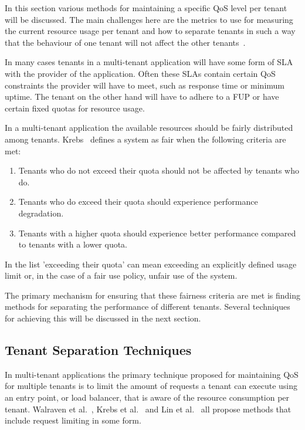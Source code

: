 In this section various methods for maintaining a specific \acf{QoS} level per tenant will be discussed.
The main challenges here are the metrics to use for measuring the current resource usage per tenant and how to separate tenants in such a way that the behaviour of one tenant will not affect the other tenants~\cite{krebs2013metrics}.

In many cases tenants in a multi-tenant application will have some form of \ac{SLA} with the provider of the application.
Often these SLAs contain certain \ac{QoS} constraints the provider will have to meet, such as response time or minimum uptime. 
The tenant on the other hand will have to adhere to a \ac{FUP} or have certain fixed quotas for resource usage.

In a multi-tenant application the available resources should be fairly distributed among tenants.
Krebs~\cite{krebs2013metrics} defines a system as fair when the following criteria are met:
\begin{enumerate}
	\item Tenants who do not exceed their quota should not be affected by tenants who do.
	\item Tenants who do exceed their quota should experience performance degradation. 
	\item Tenants with a higher quota should experience better performance compared to tenants with a lower quota.
\end{enumerate}
In the list 'exceeding their quota' can mean exceeding an explicitly defined usage limit or, in the case of a fair use policy, unfair use of the system.

The primary mechanism for ensuring that these fairness criteria are met is finding methods for separating the performance of different tenants.
Several techniques for achieving this will be discussed in the next section.

\subsection{Tenant Separation Techniques}
In multi-tenant applications the primary technique proposed for maintaining \ac{QoS} for multiple tenants is to limit the amount of requests a tenant can execute using an entry point, or load balancer, that is aware of the resource consumption per tenant.
Walraven et al.~\cite{walraven2012towards}, Krebs et al.~\cite{krebs2013metrics} and Lin et al.~\cite{lin2009feedback} all propose methods that include request limiting in some form.

